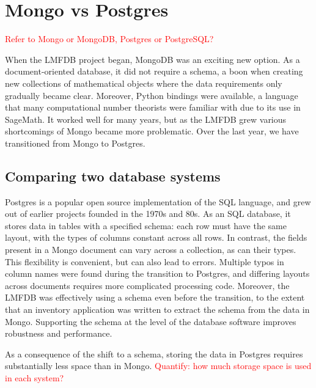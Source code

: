 \documentclass{article}
\newcommand{\todo}[1]{\textcolor{red}{#1}}
\begin{document}
\section{Mongo vs Postgres}

\todo{Refer to Mongo or MongoDB, Postgres or PostgreSQL?}

When the LMFDB project began, MongoDB was an exciting new option.  As a document-oriented database, it did not require a schema, a boon when creating new collections of mathematical objects where the data requirements only gradually became clear.  Moreover, Python bindings were available, a language that many computational number theorists were familiar with due to its use in SageMath.  It worked well for many years, but as the LMFDB grew various shortcomings of Mongo became more problematic.  Over the last year, we have transitioned from Mongo to Postgres.

\subsection{Comparing two database systems}

Postgres is a popular open source implementation of the SQL language, and grew out of earlier projects founded in the 1970s and 80s.  As an SQL database, it stores data in tables with a specified schema: each row must have the same layout, with the types of columns constant across all rows.  In contrast, the fields present in a Mongo document can vary across a collection, as can their types.  This flexibility is convenient, but can also lead to errors.  Multiple typos in column names were found during the transition to Postgres, and differing layouts across documents requires more complicated processing code.  Moreover, the LMFDB was effectively using a schema even before the transition, to the extent that an inventory application was written to extract the schema from the data in Mongo.  Supporting the schema at the level of the database software improves robustness and performance.

As a consequence of the shift to a schema, storing the data in Postgres requires substantially less space than in Mongo.  \todo{Quantify: how much storage space is used in each system?}
\end{document}
